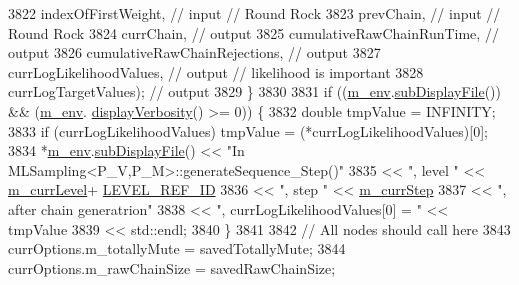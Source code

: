 \begin{DoxyCode}
3822                                     indexOfFirstWeight,           \textcolor{comment}{// input // Round Rock}
3823                                     prevChain,                    \textcolor{comment}{// input // Round Rock}
3824                                     currChain,                    \textcolor{comment}{// output}
3825                                     cumulativeRawChainRunTime,    \textcolor{comment}{// output}
3826                                     cumulativeRawChainRejections, \textcolor{comment}{// output}
3827                                     currLogLikelihoodValues,      \textcolor{comment}{// output // likelihood is important}
3828                                     currLogTargetValues);         \textcolor{comment}{// output}
3829       \}
3830 
3831       \textcolor{keywordflow}{if} ((\hyperlink{class_q_u_e_s_o_1_1_m_l_sampling_a13f1ca4fe9f94822fe572a743eaced1d}{m\_env}.\hyperlink{class_q_u_e_s_o_1_1_base_environment_a8a0064746ae8dddfece4229b9ad374d6}{subDisplayFile}()) && (\hyperlink{class_q_u_e_s_o_1_1_m_l_sampling_a13f1ca4fe9f94822fe572a743eaced1d}{m\_env}.
      \hyperlink{class_q_u_e_s_o_1_1_base_environment_a1fe5f244fc0316a0ab3e37463f108b96}{displayVerbosity}() >= 0)) \{
3832         \textcolor{keywordtype}{double} tmpValue = INFINITY;
3833         \textcolor{keywordflow}{if} (currLogLikelihoodValues) tmpValue = (*currLogLikelihoodValues)[0];
3834         *\hyperlink{class_q_u_e_s_o_1_1_m_l_sampling_a13f1ca4fe9f94822fe572a743eaced1d}{m\_env}.\hyperlink{class_q_u_e_s_o_1_1_base_environment_a8a0064746ae8dddfece4229b9ad374d6}{subDisplayFile}() << \textcolor{stringliteral}{"In MLSampling<P\_V,P\_M>::generateSequence\_Step()"}
3835                                 << \textcolor{stringliteral}{", level "} << \hyperlink{class_q_u_e_s_o_1_1_m_l_sampling_af9416874c856e50f3b35270e801f17e4}{m\_currLevel}+
      \hyperlink{_m_l_sampling_level_options_8h_a68d15eaf394d210effcf584b938206d3}{LEVEL\_REF\_ID}
3836                                 << \textcolor{stringliteral}{", step "}  << \hyperlink{class_q_u_e_s_o_1_1_m_l_sampling_a1b1f8ccb4823bdfa26ec652f0807c63e}{m\_currStep}
3837                                 << \textcolor{stringliteral}{", after chain generatrion"}
3838                                 << \textcolor{stringliteral}{", currLogLikelihoodValues[0] = "} << tmpValue
3839                                 << std::endl;
3840       \}
3841 
3842       \textcolor{comment}{// All nodes should call here}
3843       currOptions.m\_totallyMute           = savedTotallyMute;
3844       currOptions.m\_rawChainSize          = savedRawChainSize;

\end{DoxyCode}
